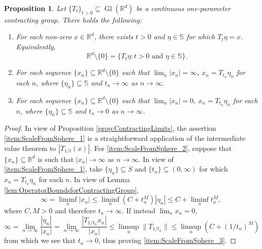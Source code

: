 \documentclass[11pt, letter]{book}
\newtheorem{proposition}[theorem]{Proposition}
\newcommand\Gl{\operatorname{Gl}} %
\begin{document}
\begin{proposition}\label{prop:ScaleFromSphere}
Let $\{T_t\}_{t>0}\subseteq\Gl(\mathbb{R}^d)$ be a continuous one-parameter contracting group. There holds the following:
\begin{enumerate}[label=(\alph*), ref=(\alph*)]
\item\label{item:ScaleFromSphere_1} For each non-zero $x\in \mathbb{R}^d$, there exists $t>0$ and $\eta\in \mathbb{S}$ for which $T_t\eta=x$. Equivalently,
\begin{equation*}
\mathbb{R}^d\setminus\{0\}=\{T_t\eta:t>0\mbox{ and }\eta\in \mathbb{S}\}.
\end{equation*}
\item\label{item:ScaleFromSphere_2} For each sequence $\{x_n\}\subseteq\mathbb{R}^d\setminus\{0\}$ such that $\lim_n|x_n|=\infty$, $x_n=T_{t_n}\eta_n$ for each $n$, where $\{\eta_n\}\subseteq \mathbb{S}$ and $t_n\rightarrow\infty$ as $n\rightarrow\infty$.
\item\label{item:ScaleFromSphere_3} For each sequence $\{x_n\}\subseteq\mathbb{R}^d\setminus\{0\}$ such that $\lim_n|x_n|=0$, $x_n=T_{t_n}\eta_n$ for each $n$, where $\{\eta_n\}\subseteq \mathbb{S}$ and $t_n\rightarrow 0$ as $n\rightarrow\infty$.
\end{enumerate}
\end{proposition}
\begin{proof}
In view of Proposition \ref{prop:ContractingLimits}, the assertion \ref{item:ScaleFromSphere_1} is a straightforward application of the intermediate value theorem to $|T_{1/t}(x)|$. For \ref{item:ScaleFromSphere_2}, suppose that $\{x_n\}\subseteq\mathbb{R}^d$ is such that $|x_n|\rightarrow \infty$ as $n\rightarrow\infty$. In view of \ref{item:ScaleFromSphere_1}, take $\{\eta_n\}\subseteq S$ and $\{t_n\}\subseteq (0,\infty)$ for which $x_n=T_{t_n}\eta_n$ for each $n$. In view of Lemma \ref{lem:OperatorBoundsforContractingGroup},
\begin{equation*}
\infty=\liminf_n |x_n|\leq\liminf_n \left(C+t_n^M\right)|\eta_n|\leq C+\liminf_nt_n^M,
\end{equation*}
where $C,M>0$ and therefore $t_n\rightarrow\infty$. If instead $\lim_n x_n=0$,
\begin{equation*}
\infty=\lim_{n\rightarrow\infty}\frac{|\eta_n|}{|x_n|}=\lim_{n\rightarrow\infty}\frac{|T_{1/t_n}x_n|}{|x_n|}\leq\limsup_n\|T_{1/t_n}\|\leq\limsup_n(C+(1/t_n)^M)
\end{equation*}
from which we see that $t_n\rightarrow 0$, thus proving \ref{item:ScaleFromSphere_3}.
\end{proof}
\end{document}
